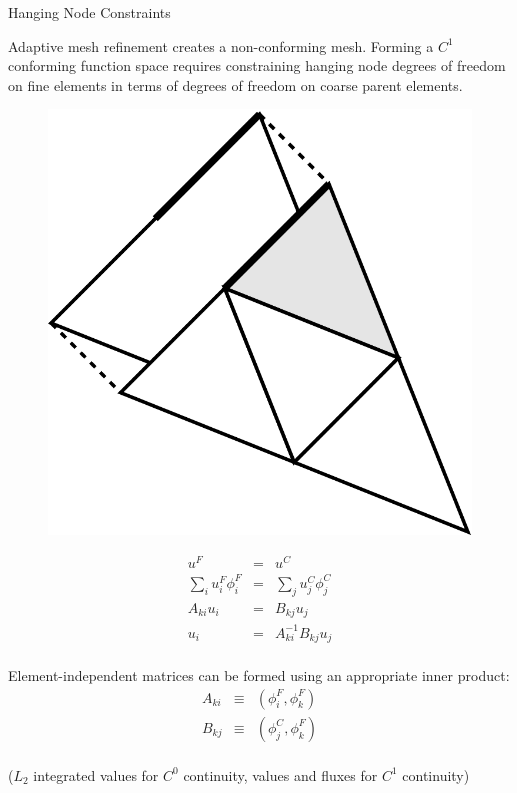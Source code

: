 \begin{foil}{Hanging Node Constraints}

Adaptive mesh refinement creates a non-conforming mesh.  Forming a
$C^1$ conforming function space requires constraining hanging node
degrees of freedom on fine elements in terms of degrees of freedom on
coarse parent elements.

\vspace{-3em}
\begin{minipage}[h]{.45\textwidth}
  \begin{figure}[h]
    \begin{center}
      \vspace{-2em}
      \includegraphics[width=.5\textwidth]{figs/adaptive}
    \end{center}
  \end{figure}
\end{minipage}
\begin{minipage}[h]{.45\textwidth}
\begin{eqnarray*}
u^F & = & u^C \\
\sum_i u_i^F \phi_i^F & = & \sum_j u_j^C \phi_j^C \\
A_{ki} u_i & = & B_{kj} u_j \\
u_i & = & A_{ki}^{-1} B_{kj} u_j \\
\end{eqnarray*}
\end{minipage}
\vspace{-3em}

Element-independent matrices can be formed using an appropriate inner
product:
\vspace{-2em}
\begin{eqnarray*}
A_{ki} & \equiv & (\phi_i^F, \phi_k^F) \\
B_{kj} & \equiv & (\phi_j^C, \phi_k^F) \\
\end{eqnarray*}
\vspace{-4em}

($L_2$ integrated values for $C^0$ continuity, values and fluxes for
$C^1$ continuity)
\end{foil}

